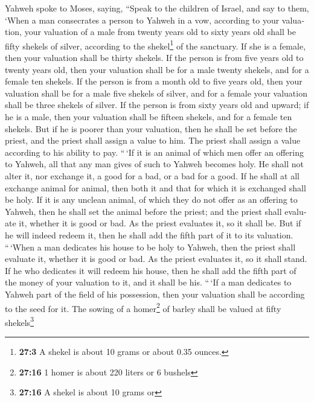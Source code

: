 \begin{paracol}{2}
\begin{otherlanguage}{english}
 Yahweh spoke to Moses, saying,  ``Speak to
the children of Israel, and say to them, `When a man consecrates a
person to Yahweh in a vow, according to your valuation, 
your valuation of a male from twenty years old to sixty years old shall
be fifty shekels of silver, according to the shekel\footnote{\textbf{27:3}
  A shekel is about 10 grams or about 0.35 ounces.} of the sanctuary.
 If she is a female, then your valuation shall be thirty
shekels.  If the person is from five years old to twenty
years old, then your valuation shall be for a male twenty shekels, and
for a female ten shekels.  If the person is from a month
old to five years old, then your valuation shall be for a male five
shekels of silver, and for a female your valuation shall be three
shekels of silver.  If the person is from sixty years old
and upward; if he is a male, then your valuation shall be fifteen
shekels, and for a female ten shekels.  But if he is
poorer than your valuation, then he shall be set before the priest, and
the priest shall assign a value to him. The priest shall assign a value
according to his ability to pay.  ``\,`If it is an animal
of which men offer an offering to Yahweh, all that any man gives of such
to Yahweh becomes holy.  He shall not alter it, nor
exchange it, a good for a bad, or a bad for a good. If he shall at all
exchange animal for animal, then both it and that for which it is
exchanged shall be holy.  If it is any unclean animal, of
which they do not offer as an offering to Yahweh, then he shall set the
animal before the priest;  and the priest shall evaluate
it, whether it is good or bad. As the priest evaluates it, so it shall
be.  But if he will indeed redeem it, then he shall add
the fifth part of it to its valuation.  ``\,`When a man
dedicates his house to be holy to Yahweh, then the priest shall evaluate
it, whether it is good or bad. As the priest evaluates it, so it shall
stand.  If he who dedicates it will redeem his house,
then he shall add the fifth part of the money of your valuation to it,
and it shall be his.  ``\,`If a man dedicates to Yahweh
part of the field of his possession, then your valuation shall be
according to the seed for it. The sowing of a homer\footnote{\textbf{27:16}
  1 homer is about 220 liters or 6 bushels} of barley shall be valued at
fifty shekels\footnote{\textbf{27:16} A shekel is about 10 grams or
}
\end{otherlanguage}
\end{paracol}
